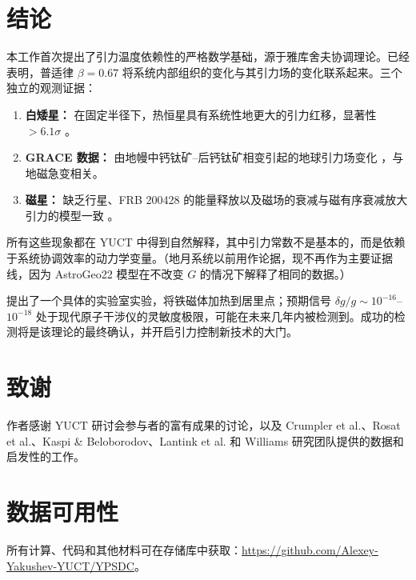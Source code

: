 \documentclass[12pt]{article}
\theoremstyle{remark}
\begin{document}
	\section{结论}
	\label{sec:conclusion}
	
	本工作首次提出了引力温度依赖性的严格数学基础，源于雅库舍夫协调理论。已经表明，普适律 $\beta = 0.67$ 将系统内部组织的变化与其引力场的变化联系起来。三个独立的观测证据：
	\begin{enumerate}
		\item \textbf{白矮星：} 在固定半径下，热恒星具有系统性地更大的引力红移，显著性 $>6.1\sigma$ \cite{Crumpler2024}。
		\item \textbf{GRACE 数据：} 由地幔中钙钛矿–后钙钛矿相变引起的地球引力场变化 \cite{Rosat2025}，与地磁急变相关。
		\item \textbf{磁星：} 缺乏行星、FRB 200428 的能量释放以及磁场的衰减与磁有序衰减放大引力的模型一致 \cite{Kaspi2017, Geng2020}。
	\end{enumerate}
	所有这些现象都在 YUCT 中得到自然解释，其中引力常数不是基本的，而是依赖于系统协调效率的动力学变量。（地月系统以前用作论据，现不再作为主要证据线，因为 AstroGeo22 模型在不改变 $G$ 的情况下解释了相同的数据。）
	
	提出了一个具体的实验室实验，将铁磁体加热到居里点；预期信号 $\delta g/g \sim 10^{-16}$–$10^{-18}$ 处于现代原子干涉仪的灵敏度极限，可能在未来几年内被检测到。成功的检测将是该理论的最终确认，并开启引力控制新技术的大门。
	
	\section*{致谢}
	作者感谢 YUCT 研讨会参与者的富有成果的讨论，以及 Crumpler et al.、Rosat et al.、Kaspi \& Beloborodov、Lantink et al. 和 Williams 研究团队提供的数据和启发性的工作。
	
	\section*{数据可用性}
	所有计算、代码和其他材料可在存储库中获取：\url{https://github.com/Alexey-Yakushev-YUCT/YPSDC}。
	
\end{document}
